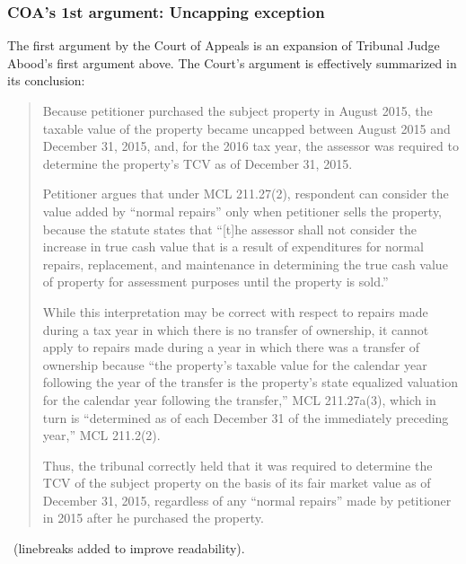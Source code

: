 \documentclass[12pt,\documentclassflag]{michiganCourtOfAppealsBrief}
\begin{document}
\subsubsection{COA's 1st argument: Uncapping exception}

The first argument by the Court of Appeals is an expansion of Tribunal Judge Abood's first argument above. The Court's argument is effectively summarized in its conclusion:

\begin{quotation}
Because petitioner purchased the subject property in August 2015, the taxable value of the
property became uncapped between August 2015 and December 31, 2015, and, for the 2016 tax
year, the assessor was required to determine the property's TCV as of December 31, 2015.

Petitioner argues that under MCL 211.27(2), respondent can consider the value added by ``normal
repairs'' only when petitioner sells the property, because the statute states that ``[t]he assessor shall
not consider the increase in true cash value that is a result of expenditures for normal repairs,
replacement, and maintenance in determining the true cash value of property for assessment
purposes until the property is sold.''

While this interpretation may be correct with respect to repairs
made during a tax year in which there is no transfer of ownership, it cannot apply to repairs made
during a year in which there was a transfer of ownership because ``the property's taxable value for
the calendar year following the year of the transfer is the property's state equalized valuation for
the calendar year following the transfer,'' MCL 211.27a(3), which in turn is ``determined as of each
December 31 of the immediately preceding year,'' MCL 211.2(2).

Thus, the tribunal correctly
held that it was required to determine the TCV of the subject property on the basis of its fair market
value as of December 31, 2015, regardless of any ``normal repairs'' made by petitioner in 2015
after he purchased the property.
\end{quotation}
\ (linebreaks added to improve readability).
\end{document}
